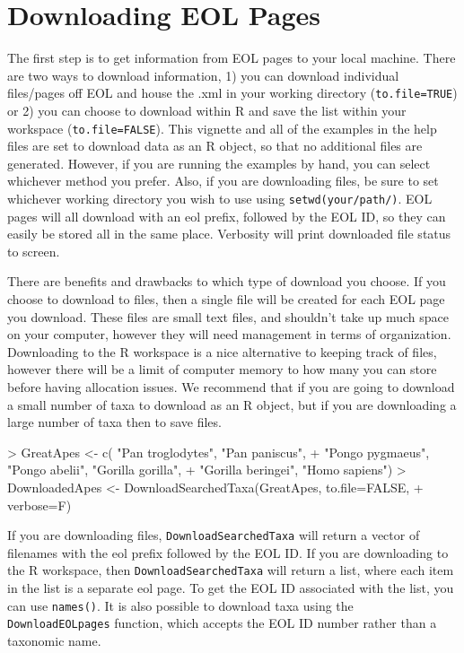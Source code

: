 \documentclass[12pt]{article}
\begin{document}
 \section{Downloading EOL Pages}
The first step is to get information from EOL pages to your local machine. There are two ways to download information, 1) you can download individual files/pages off EOL and house the .xml in your working directory (\texttt{to.file=TRUE}) or 2) you can choose to download within R and save the list within your workspace (\texttt{to.file=FALSE}). This vignette and all of the examples in the help files are set to download data as an R object, so that no additional files are generated. However, if you are running the examples by hand, you can select whichever method you prefer. Also, if you are downloading files, be sure to set whichever working directory you wish to use using \texttt{setwd(your/path/)}. EOL pages will all download with an eol prefix, followed by the EOL ID, so they can easily be stored all in the same place. Verbosity will print downloaded file status to screen. 

There are benefits and drawbacks to which type of download you choose. If you choose to download to files, then a single file will be created for each EOL page you download. These files are small text files, and shouldn't take up much space on your computer, however they will need management in terms of organization. Downloading to the R workspace is a nice alternative to keeping track of files, however there will be a limit of computer memory to how many you can store before having allocation issues. We recommend that if you are going to download a small number of taxa to download as an R object, but if you are downloading a large number of taxa then to save files.  
 
\begin{Schunk}
\begin{Sinput}
> GreatApes <- c( "Pan troglodytes",  "Pan paniscus",
+          "Pongo pygmaeus", "Pongo abelii", "Gorilla gorilla", 
+ 	"Gorilla beringei", "Homo sapiens")
> DownloadedApes <- DownloadSearchedTaxa(GreatApes, to.file=FALSE, 
+ 	verbose=F)
\end{Sinput}
\end{Schunk}

If you are downloading files, \texttt{DownloadSearchedTaxa} will return a vector of filenames with the eol prefix followed by the EOL ID. If you are downloading to the R workspace, then \texttt{DownloadSearchedTaxa} will return a list, where each item in the list is a separate eol page. To get the EOL ID associated with the list, you can use \texttt{names()}. It is also possible to download taxa using the \texttt{DownloadEOLpages} function, which accepts the EOL ID number rather than a taxonomic name. 
\end{document}
